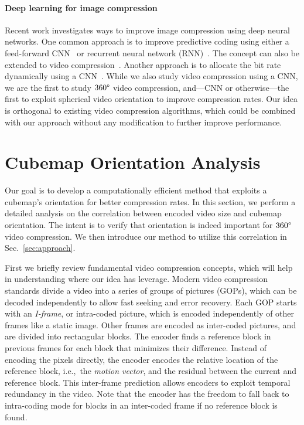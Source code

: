 \documentclass[journal,transmag]{IEEEtran}
\begin{document}
\paragraph{Deep learning for image compression}\label{par:deep_learning_for_compression}

Recent work investigates ways to improve image compression using deep neural networks.
One common approach is to improve predictive coding using either a feed-forward CNN~\cite{santurkar2017generative,rippel2017real} or recurrent neural network (RNN)~\cite{toderici2015variable,toderici2016full,johnston2017improved}.
The concept can also be extended to video compression~\cite{santurkar2017generative}.
Another approach is to allocate the bit rate dynamically using a CNN~\cite{li2017learning}.
While we also study video compression using a CNN,
we are the first to study $360\degree$ video compression, and---CNN or otherwise---the first to exploit spherical video orientation to improve compression rates.
Our idea is orthogonal to existing video compression algorithms, which could be combined with our approach without any modification to further improve performance.



\section{Cubemap Orientation Analysis}
\label{sec:analysis}

Our goal is to develop a computationally efficient method that exploits a cubemap's orientation for better compression rates.
In this section, we perform a detailed analysis on the correlation between encoded video size and cubemap orientation.
The intent is to verify that orientation is indeed important for $360\degree$ video compression.
We then introduce our method to utilize this correlation in Sec.~\ref{sec:approach}.


First we briefly review fundamental video compression concepts, which will help in understanding where our idea has leverage.  
Modern video compression standards divide a video into a series of groups of pictures (GOPs), 
which can be decoded independently to allow fast seeking and error recovery.
Each GOP starts with an \emph{I-frame},
or intra-coded picture,
which is encoded independently of other frames like a static image.
Other frames are encoded as inter-coded pictures,
and are divided into rectangular blocks.
The encoder finds a reference block in previous frames for each block that minimizes their difference.
Instead of encoding the pixels directly,
the encoder encodes the relative location of the reference block,
i.e.,~the \emph{motion vector},
and the residual between the current and reference block.
This inter-frame prediction allows encoders to exploit temporal redundancy in the video.
Note that the encoder has the freedom to fall back to intra-coding mode for blocks in an inter-coded frame if no reference block is found.
\end{document}
